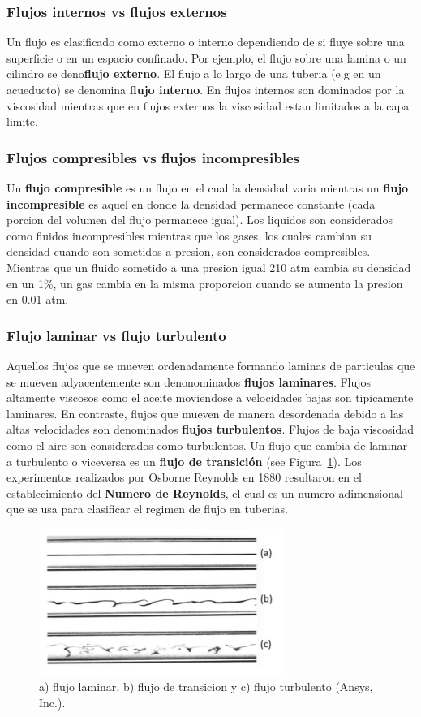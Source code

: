 \documentclass[10pt, oneside]{article}
\begin{document}
\subsubsection{Flujos internos vs flujos externos} 
Un flujo es clasificado como externo o interno dependiendo de si fluye sobre una superficie o en un espacio confinado. Por ejemplo, el flujo sobre una lamina o un cilindro se deno\textbf{flujo externo}. El flujo a lo largo de una tuberia (e.g en un acueducto) se denomina \textbf{flujo interno}. En flujos internos son dominados por la viscosidad mientras que en flujos externos la viscosidad estan limitados a la capa limite.

\subsubsection{Flujos compresibles vs flujos incompresibles} 
Un \textbf{flujo compresible} es un flujo en el cual la densidad varia mientras un \textbf{flujo incompresible} es aquel en donde la densidad permanece constante (cada porcion del volumen del flujo permanece igual). Los liquidos son considerados como fluidos incompresibles mientras que los gases, los cuales cambian su densidad cuando son sometidos a presion, son considerados compresibles. Mientras que un fluido sometido a una presion igual 210 atm cambia su densidad en un 1\%, un gas cambia en la misma proporcion cuando se aumenta la presion en 0.01 atm. 


\subsubsection{Flujo laminar vs flujo turbulento}
Aquellos flujos que se mueven ordenadamente formando laminas de particulas que se mueven adyacentemente son denonominados \textbf{flujos laminares}. Flujos altamente viscosos como el aceite moviendose a velocidades bajas son tipicamente laminares. En contraste, flujos que mueven de manera desordenada debido a las altas velocidades son denominados \textbf{flujos turbulentos}. Flujos de baja viscosidad como el aire son considerados como turbulentos. Un flujo que cambia de laminar a turbulento o viceversa es un \textbf{flujo de transici\'on} (see Figura~\ref{fLamTur}). Los experimentos realizados por Osborne Reynolds en 1880 resultaron en el establecimiento del \textbf{Numero de Reynolds}, el cual es un numero adimensional que se usa para clasificar el regimen de flujo en tuberias.  

\begin{figure}[h]
\centering
\includegraphics[width=8cm]{fLamTur}
\caption{a) flujo laminar, b) flujo de transicion y c) flujo turbulento (Ansys, Inc.).}
\label{fLamTur}
\end{figure}
\end{document}
